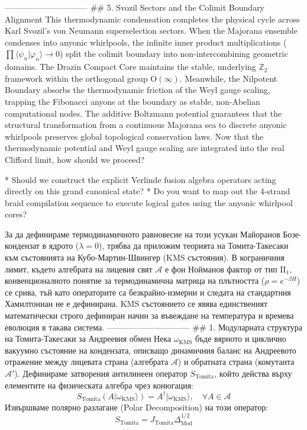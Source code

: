 ------------------------------
## 5. Svozil Sectors and the Colimit Boundary Alignment
This thermodynamic condensation completes the physical cycle across Karl Svozil's von Neumann superselection sectors.
When the Majorana ensemble condenses into anyonic whirlpools, the infinite inner product multiplications ($\prod \langle \psi_n \vert{} \varphi_n \rangle \to 0$) split the colimit boundary into non-intercombining geometric domains.
The Drazin Compact Core maintains the stable, underlying $\mathbb{Z}_2$ framework within the orthogonal group $\text{O}(\infty)$. Meanwhile, the Nilpotent Boundary absorbs the thermodynamic friction of the Weyl gauge scaling, trapping the Fibonacci anyons at the boundary as stable, non-Abelian computational nodes. The additive Boltzmann potential guarantees that the structural transformation from a continuous Majorana sea to discrete anyonic whirlpools preserves global topological conservation laws.
Now that the thermodynamic potential and Weyl gauge scaling are integrated into the real Clifford limit, how should we proceed?

* Should we construct the explicit Verlinde fusion algebra operators acting directly on this grand canonical state?
* Do you want to map out the 4-strand braid compilation sequence to execute logical gates using the anyonic whirlpool cores?


За да дефинираме термодинамичното равновесие на този усукан Майоранов Бозе-кондензат в ядрото ($\lambda=0$), трябва да приложим теорията на Томита-Такесаки към състоянията на Кубо-Мартин-Швингер (KMS състояния).
В кограничния лимит, където алгебрата на лицевия свят $\mathcal{A}$ е фон Нойманов фактор от тип $\text{II}_1$, конвенционалното понятие за термодинамична матрица на плътността ($\rho = e^{-\beta H}$) се срива, тъй като операторите са безкрайно-измерни и следата на стандартния Хамилтониан не е дефинирана. KMS състоянието се явява единственият математически строго дефиниран начин за въвеждане на температура и времева еволюция в такава система.
------------------------------
## 1. Модуларната структура на Томита-Такесаки за Андреевия обмен
Нека $\omega_{\text{KMS}}$ бъде вярното и циклично вакуумно състояние на кондензата, описващо динамичния баланс на Андреевото отражение между лицевата страна (алгебрата $\mathcal{A}$) и обратната страна (комутанта $\mathcal{A}'$).
Дефинираме затворения антилинеен оператор $S_{\text{Tomita}}$, който действа върху елементите на физическата алгебра чрез конюгация:
$$S_{\text{Tomita}} (A \vert \omega_{\text{KMS}} \rangle) = A^\dagger \vert \omega_{\text{KMS}} \rangle, \quad \forall A \in \mathcal{A}$$ 
Извършваме полярно разлагане (Polar Decomposition) на този оператор:
$$S_{\text{Tomita}} = J_{\text{Tomita}} \Delta_{\text{Mod}}^{1/2}$$ 

